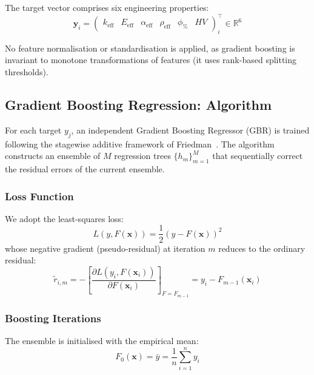 \documentclass[11pt,a4paper]{article}
\begin{document}
The target vector comprises six engineering properties:
\begin{equation}
    \mathbf{y}_i = \begin{pmatrix}
        k_{\text{eff}} & E_{\text{eff}} & \alpha_{\text{eff}} & \rho_{\text{eff}} & \phi_{\%} & HV
    \end{pmatrix}^\top_i \in \mathbb{R}^6
\end{equation}

No feature normalisation or standardisation is applied, as gradient boosting is invariant to monotone transformations of features (it uses rank-based splitting thresholds).

\subsection{Gradient Boosting Regression: Algorithm}
\label{sec:gbr}

For each target $y_j$, an independent Gradient Boosting Regressor (GBR) is trained following the stagewise additive framework of Friedman~\cite{friedman2001}. The algorithm constructs an ensemble of $M$ regression trees $\{h_m\}_{m=1}^M$ that sequentially correct the residual errors of the current ensemble.

\subsubsection{Loss Function}

We adopt the least-squares loss:
\begin{equation}
    L(y, F(\mathbf{x})) = \frac{1}{2}(y - F(\mathbf{x}))^2
\end{equation}
whose negative gradient (pseudo-residual) at iteration $m$ reduces to the ordinary residual:
\begin{equation}
    \tilde{r}_{i,m} = -\left[\frac{\partial L(y_i, F(\mathbf{x}_i))}{\partial F(\mathbf{x}_i)}\right]_{F = F_{m-1}} = y_i - F_{m-1}(\mathbf{x}_i)
    \label{eq:pseudoresid}
\end{equation}

\subsubsection{Boosting Iterations}

The ensemble is initialised with the empirical mean:
\begin{equation}
    F_0(\mathbf{x}) = \bar{y} = \frac{1}{n} \sum_{i=1}^n y_i
\end{equation}
\end{document}
